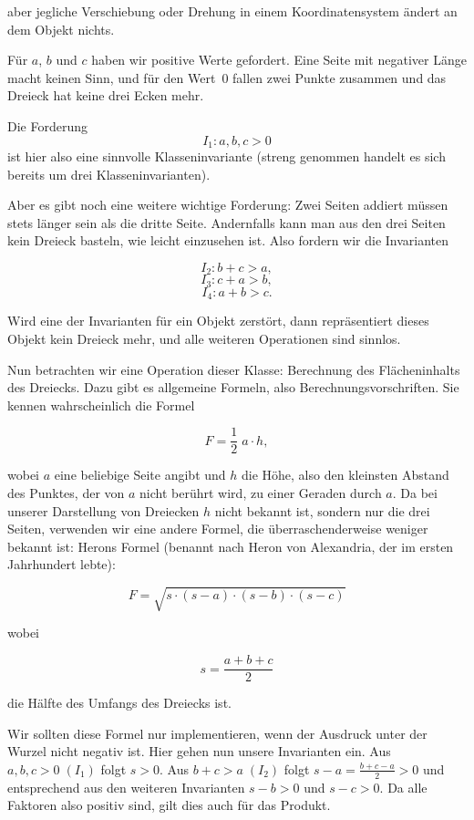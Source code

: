 \vspace{-2mm} %

aber jegliche Verschiebung oder Drehung in einem Koordinatensystem ändert an dem Objekt nichts.

\pagebreak %

Für $a$, $b$ und $c$ haben wir positive Werte gefordert. Eine Seite mit negativer Länge macht keinen Sinn, und für den Wert~0 fallen zwei Punkte zusammen und das Dreieck hat keine drei Ecken mehr. 

Die Forderung $$I_1: a, b, c >0$$ ist hier also eine sinnvolle Klasseninvariante (streng genommen handelt es sich bereits um drei Klasseninvarianten). 

Aber es gibt noch eine weitere wichtige Forderung: Zwei Seiten addiert müssen stets länger sein als die dritte Seite. Andernfalls kann man aus den drei Seiten kein Dreieck basteln, wie leicht einzusehen ist. Also fordern wir die Invarianten

$$I_2: b+c>a,$$
$$I_3: c+a>b,$$
$$I_4: a+b > c.$$ 

Wird eine der Invarianten für ein Objekt zerstört, dann repräsentiert dieses Objekt kein Dreieck mehr, und alle weiteren Operationen sind sinnlos.

Nun betrachten wir eine Operation dieser Klasse: Berechnung des Flächeninhalts des Dreiecks. Dazu gibt es allgemeine Formeln, also Berechnungsvorschriften. Sie kennen wahrscheinlich die Formel 

$$ F = \frac{1}{2} \; a \cdot h,$$

wobei $a$ eine beliebige Seite angibt und $h$ die Höhe, also den kleinsten Abstand des Punktes, der von $a$ nicht berührt wird, zu einer Geraden durch $a$. Da bei unserer Darstellung von Dreiecken $h$ nicht bekannt ist, sondern nur die drei Seiten, verwenden wir eine andere Formel, die überraschenderweise weniger bekannt ist: Herons Formel (benannt nach Heron von Alexandria, der im ersten Jahrhundert lebte):

$$F = \sqrt{s\cdot (s-a)\cdot (s-b) \cdot (s-c)} $$

wobei 

$$s = \frac{a+b+c}{2}$$

die Hälfte des Umfangs des Dreiecks ist.

Wir sollten diese Formel nur implementieren, wenn der Ausdruck unter der Wurzel nicht negativ ist. Hier gehen nun unsere Invarianten ein. Aus $a,b,c >0 \; (I_1)$ folgt $s>0$. Aus $b+c > a \; (I_2)$ folgt $s- a = \frac{b+c-a}{2} >0$ und entsprechend aus den weiteren Invarianten $s-b > 0$ und $s-c >0$. Da alle Faktoren also positiv sind, gilt dies auch für das Produkt.

